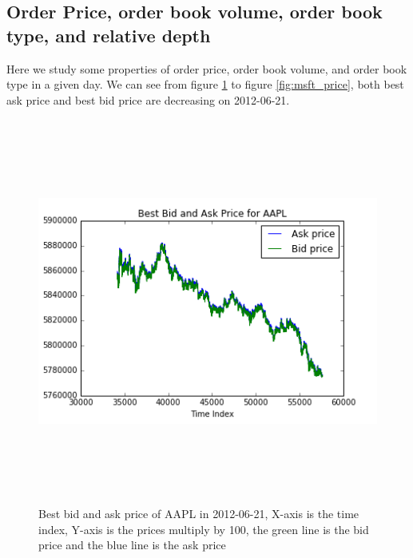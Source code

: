 \subsection{Order Price,  order book volume,  order book type,   and relative depth}
Here we study some properties of order price,  order book volume,   and order book type in a given day. We can see from figure \ref{fig:aapl_price} to figure \ref{fig:msft_price},   both best ask price and best bid price are decreasing on 2012-06-21. \\
\begin{figure} [hp]
  \begin{center}
    \includegraphics[width=6in,  height=5in]{figures/AAPL_price.png}
  \end{center}
\caption{Best bid and ask price of AAPL in 2012-06-21,   X-axis is the time index,   Y-axis is the prices multiply by 100,   the green line is the bid price and the blue line is the ask price} \label{fig:aapl_price}
\end{figure}
